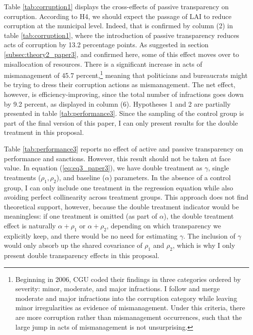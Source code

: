 \documentclass[11pt]{article}
\newcommand{\refp}[1]{(\ref{#1})}
\begin{document}
Table \ref{tab:corruption1} displays the cross-effects of passive transparency on corruption. According to H4, we should expect the passage of LAI to reduce corruption at the municipal level. Indeed, that is confirmed by column (2) in table \ref{tab:corruption1}, where the introduction of passive transparency reduces acts of corruption by 13.2 percentage points. As suggested in section \ref{subsec:theory2_paper3}, and confirmed here, some of this effect moves over to misallocation of resources. There is a significant increase in acts of mismanagement of 45.7 percent,\footnote{Beginning in 2006, CGU coded their findings in three categories ordered by severity: minor, moderate, and major infractions. I follow \citet{AvisGovernmentAuditsReduce2018} and merge moderate and major infractions into the corruption category while leaving minor irregularities as evidence of mismanagement. Under this criteria, there are more corruption rather than mismanagement occurrences, such that the large jump in acts of mismanagement is not unsurprising.} meaning that politicians and bureaucrats might be trying to dress their corruption actions as mismanagement. The net effect, however, is efficiency-improving, since the total number of infractions goes down by 9.2 percent, as displayed in column (6).
\clearpage
Hypotheses 1 and 2 are partially presented in table \ref{tab:performance3}. Since the sampling of the control group is part of the final version of this paper, I can only present results for the double treatment in this proposal.



Table \ref{tab:performance3} reports no effect of active and passive transparency on performance and sanctions. However, this result should not be taken at face value. In equation \refp{eq:eq3_paper3}, we have double treatment as $\gamma$, single treatments ($\rho_{1}, \rho_{2}$), and baseline  ($\alpha$) parameters. In the absence of a control group, I can only include one treatment in the regression equation while also avoiding perfect collinearity across treatment groups. This approach does not find theoretical support, however, because the double treatment indicator would be meaningless: if one treatment is omitted (as part of $\alpha$), the double treatment effect is naturally $\alpha + \rho_{1}$ or $\alpha + \rho_{2}$, depending on which transparency we explicitly keep, and there would be no need for estimating $\gamma$. The inclusion of $\gamma$ would only absorb up the shared covariance of $\rho_{1}$ and $\rho_{2}$, which is why I only present double transparency effects in this proposal.
\end{document}
